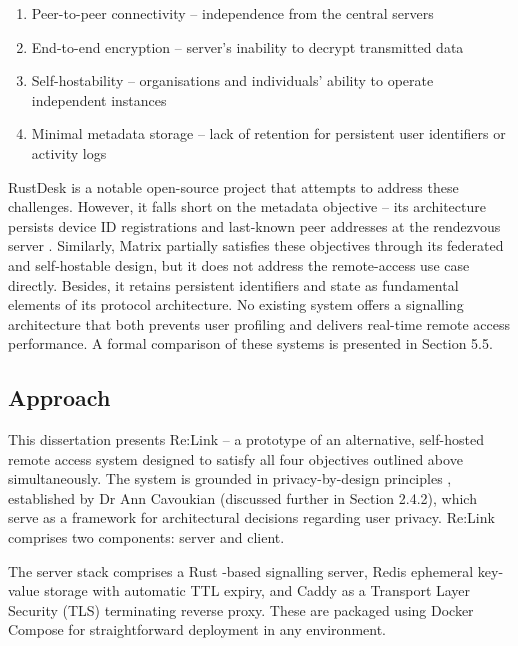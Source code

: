 \documentclass[12pt,a4paper]{article}
\begin{document}
\begin{enumerate}

\item Peer-to-peer connectivity – independence from the central servers

\item End-to-end encryption – server’s inability to decrypt transmitted data

\item Self-hostability – organisations and individuals’ ability to operate independent instances

\item Minimal metadata storage – lack of retention for persistent user identifiers or activity logs

\end{enumerate}

RustDesk \cite{rustdesk} is a notable open-source project that attempts to address these challenges. However, it falls short on the metadata objective – its architecture persists device ID registrations and last-known peer addresses at the rendezvous server \cite{rustdeskselfhost,flokinetrustdesk}. Similarly, Matrix \cite{matrix} partially satisfies these objectives through its federated and self-hostable design, but it does not address the remote-access use case directly. Besides, it retains persistent identifiers and state as fundamental elements of its protocol architecture. No existing system offers a signalling architecture that both prevents user profiling and delivers real-time remote access performance. A formal comparison of these systems is presented in Section 5.5.

\subsection{Approach}

This dissertation presents Re:Link – a prototype of an alternative, self-hosted remote access system designed to satisfy all four objectives outlined above simultaneously. The system is grounded in privacy-by-design principles \cite{cavoukian2011}, established by Dr Ann Cavoukian (discussed further in Section 2.4.2), which serve as a framework for architectural decisions regarding user privacy. Re:Link comprises two components: server and client.

The server stack comprises a Rust \cite{rustbook}-based signalling server, Redis \cite{redis} ephemeral key-value storage with automatic TTL expiry, and Caddy \cite{caddy} as a Transport Layer Security (TLS) terminating reverse proxy. These are packaged using Docker Compose \cite{docker} for straightforward deployment in any environment.
\end{document}
